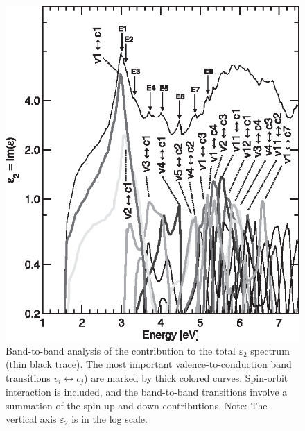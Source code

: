 \documentclass[a4paper, 12pt, titlepage,oneside,drop]{kthesis}
\begin{document}
\begin{figure}[H]
\begin{center}
\includegraphics[scale=.8]{paper3figure2.eps}
\end{center}
\caption{ Band-to-band analysis of the contribution to the total $\varepsilon_2$ spectrum (thin black trace). The most important valence-to-conduction band transitions $v_i \leftrightarrow c_j$) 
are marked by thick colored curves. Spin-orbit interaction is included, and the band-to-band transitions involve a summation of the spin up and down contributions.
 Note: The vertical axis $\varepsilon_2$ is in the log scale.}
\label{paper3figure2}
\end{figure} 
\end{document}

